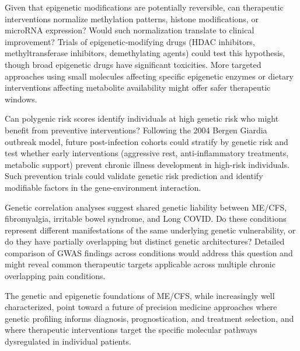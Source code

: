 \begin{open_question}
Given that epigenetic modifications are potentially reversible, can therapeutic interventions normalize methylation patterns, histone modifications, or microRNA expression? Would such normalization translate to clinical improvement? Trials of epigenetic-modifying drugs (HDAC inhibitors, methyltransferase inhibitors, demethylating agents) could test this hypothesis, though broad epigenetic drugs have significant toxicities. More targeted approaches using small molecules affecting specific epigenetic enzymes or dietary interventions affecting metabolite availability might offer safer therapeutic windows.
\end{open_question}

\begin{open_question}
Can polygenic risk scores identify individuals at high genetic risk who might benefit from preventive interventions? Following the 2004 Bergen Giardia outbreak model, future post-infection cohorts could stratify by genetic risk and test whether early interventions (aggressive rest, anti-inflammatory treatments, metabolic support) prevent chronic illness development in high-risk individuals. Such prevention trials could validate genetic risk prediction and identify modifiable factors in the gene-environment interaction.
\end{open_question}

\begin{open_question}
Genetic correlation analyses suggest shared genetic liability between ME/CFS, fibromyalgia, irritable bowel syndrome, and Long COVID. Do these conditions represent different manifestations of the same underlying genetic vulnerability, or do they have partially overlapping but distinct genetic architectures? Detailed comparison of GWAS findings across conditions would address this question and might reveal common therapeutic targets applicable across multiple chronic overlapping pain conditions.
\end{open_question}

The genetic and epigenetic foundations of ME/CFS, while increasingly well characterized, point toward a future of precision medicine approaches where genetic profiling informs diagnosis, prognostication, and treatment selection, and where therapeutic interventions target the specific molecular pathways dysregulated in individual patients.

